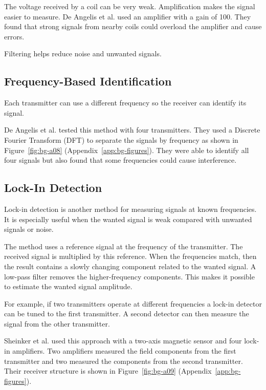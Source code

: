The voltage received by a coil can be very weak. Amplification makes the signal easier to measure.
De Angelis et al. \cite{deangelis2015indoor} used an amplifier with a gain of 100.
They found that strong signals from nearby coils could overload the amplifier and cause errors.

Filtering helps reduce noise and unwanted signals. 


\subsection{Frequency-Based Identification} \label{sec:bg-1-4-2}

Each transmitter can use a different frequency so the receiver can identify its signal.

De Angelis et al. \cite{deangelis2015indoor} tested this method with four transmitters.
They used a Discrete Fourier Transform (DFT) to separate the signals by frequency as shown in Figure~\ref{fig:bg-a08}
(Appendix~\ref{app:bg-figures}).
They were able to identify all four signals but also found that some frequencies could cause interference.




\subsection{Lock-In Detection}\label{sec:bg-1-4-3}

Lock-in detection is another method for measuring signals at known frequencies. It is especially useful when the wanted signal is weak compared with 
unwanted signals or noise.

The method uses a reference signal at the frequency of the transmitter. The received signal is multiplied by this reference. When the frequencies match, 
then the result contains a slowly changing component related to the wanted signal. A low-pass filter removes the higher-frequency components. This makes it possible to estimate the wanted signal amplitude.

For example, if two transmitters operate at different frequencies a lock-in detector can be tuned to the first transmitter. A second detector can then 
measure the signal from the other transmitter.

Sheinker et al. \cite{sheinker2013localization} used this approach with a two-axis magnetic sensor and four lock-in amplifiers. Two amplifiers measured 
the field components from the first transmitter and two measured the components from the second transmitter. Their receiver structure is shown in 
Figure~\ref{fig:bg-a09} (Appendix~\ref{app:bg-figures}).

